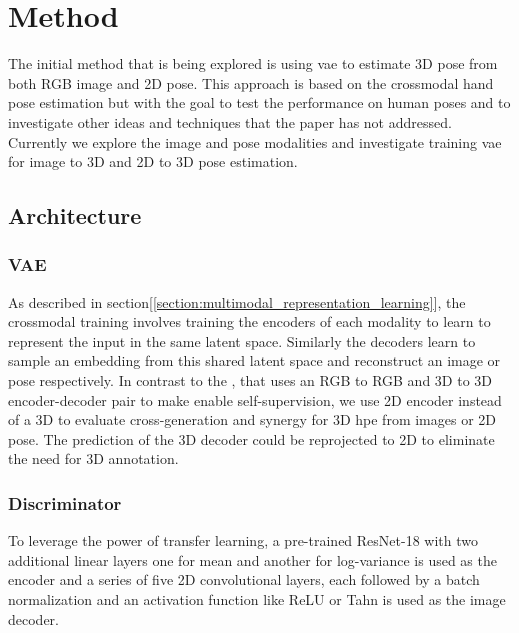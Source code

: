 \chapter{Method}
The initial method that is being explored is using \ac{vae} to estimate 3D pose from both RGB image and 2D pose. This approach is based on the crossmodal hand pose estimation \cite{crossmodal} but with the goal to test the performance on human poses and to investigate other ideas and techniques that the paper has not addressed. Currently we explore the image and pose modalities and investigate training \ac{vae} for image to 3D and 2D to 3D pose estimation.


\section{Architecture}
\subsection{VAE} %
As described in section[\ref{section:multimodal_representation_learning}], the crossmodal training involves training the encoders of each modality to learn to represent the input in the same latent space. Similarly the decoders learn to sample an embedding from this shared latent space and reconstruct an image or pose respectively. In contrast to the \cite{crossmodal}, that uses an RGB to RGB and 3D to 3D encoder-decoder pair to make enable self-supervision, we use 2D encoder instead of a 3D to evaluate cross-generation and synergy for 3D \ac{hpe} from images or 2D pose. The prediction of the 3D decoder could be reprojected to 2D to eliminate the need for 3D annotation.

\subsection{Discriminator}%
To leverage the power of transfer learning, a pre-trained ResNet-18 \cite{resnet} with two additional linear layers one for mean and another for log-variance is used as the encoder and a series of five 2D convolutional layers, each followed by a batch normalization and an activation function like ReLU or Tahn is used as the image decoder.

